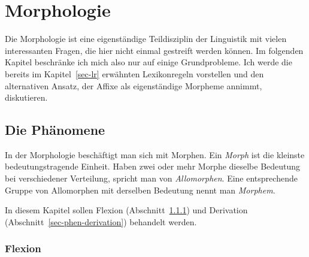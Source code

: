 


\chapter{Morphologie}
\label{chap-morphologie}

Die Morphologie ist eine eigenständige Teildisziplin der Linguistik mit vielen interessanten
Fragen, die hier nicht einmal gestreift werden können. Im folgenden Kapitel beschränke ich
mich also nur auf einige Grundprobleme. Ich werde die bereits im Kapitel~\ref{sec-lr}
erwähnten Lexikonregeln vorstellen und den alternativen Ansatz, der Affixe als eigenständige
Morpheme annimmt, diskutieren.


\section{Die Phänomene}

In der Morphologie beschäftigt man sich mit Morphen. Ein \emph{Morph} ist
die kleinste bedeutungstragende Einheit. Haben zwei oder mehr Morphe dieselbe Bedeutung
bei verschiedener Verteilung, spricht man von \emph{Allomorphen}. Eine entsprechende Gruppe
von Allomorphen mit derselben Bedeutung nennt man \emph{Morphem}. 

In diesem Kapitel sollen Flexion (Abschnitt~\ref{sec-phen-flexion})
und Derivation (Abschnitt~\ref{sec-phen-derivation}) behandelt werden.

\subsection{Flexion}
\label{sec-phen-flexion}



